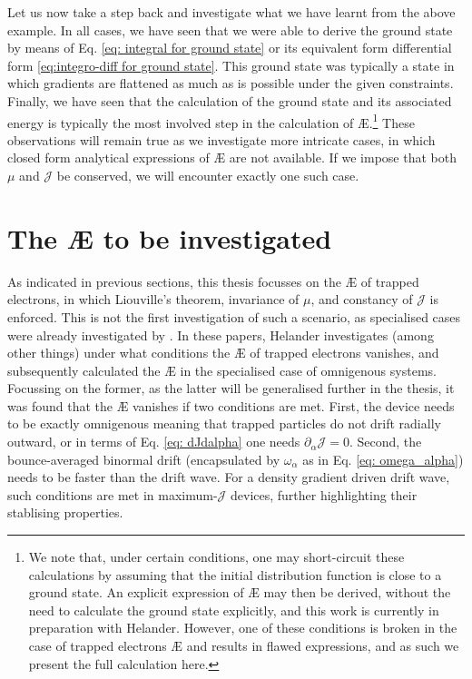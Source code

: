 Let us now take a step back and investigate what we have learnt from the above example. In all cases, we have seen that we were able to derive the ground state by means of Eq. \eqref{eq: integral for ground state} or its equivalent form differential form \eqref{eq:integro-diff for ground state}.  This ground state was typically a state in which gradients are flattened as much as is possible under the given constraints. Finally, we have seen that the calculation of the ground state and its associated energy is typically the most involved step in the calculation of \AE{}.\footnote{We note that, under certain conditions, one may short-circuit these calculations by assuming that the initial distribution function is close to a ground state. An explicit expression of \AE{} may then be derived, without the need to calculate the ground state explicitly, and this work is currently in preparation with Helander. However, one of these conditions is broken in the case of trapped electrons \AE{} and results in flawed expressions, and as such we present the full calculation here.} These observations will remain true as we investigate more intricate cases, in which closed form analytical expressions of \AE{} are not available. If we impose that both $\mu$ and $\mathcal{J}$ be conserved, we will encounter exactly one such case.

\section{The \AE{} to be investigated}
As indicated in previous sections, this thesis focusses on the \AE{} of trapped electrons, in which Liouville's theorem, invariance of $\mu$, and constancy of $\mathcal{J}$ is enforced. This is not the first investigation of such a scenario, as specialised cases were already investigated by \citet{helander2017available,helander2020available}. In these papers, Helander investigates (among other things) under what conditions the \AE{} of trapped electrons vanishes, and subsequently calculated the \AE{} in the specialised case of omnigenous systems. Focussing on the former, as the latter will be generalised further in the thesis, it was found that the \AE{} vanishes if two conditions are met. First, the device needs to be exactly omnigenous meaning that trapped particles do not drift radially outward, or in terms of Eq. \eqref{eq: dJdalpha} one needs $\partial_\alpha \mathcal{J} = 0$. Second, the bounce-averaged binormal drift (encapsulated by $\omega_\alpha$ as in Eq. \eqref{eq: omega_alpha}) needs to be faster than the drift wave. For a density gradient driven drift wave, such conditions are met in maximum-$\mathcal{J}$ devices, further highlighting their stablising properties. \par 

